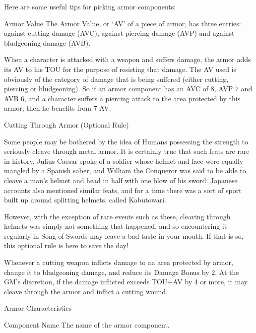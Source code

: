 \documentclass[oneside,11pt,english]{book}
\begin{document}
Here are some useful tips for picking armor components: 

 

Armor Value 
The Armor Value, or ‘AV’ of a piece of armor, has three entries: against cutting damage (AVC), against 
piercing damage (AVP) and against bludgeoning damage (AVB). 

 

When a character is attacked with a weapon and suffers damage, the armor adds its AV to his TOU for 
the purpose of resisting that damage. The AV used is obviously of the category of damage that is being 
suffered (either cutting, piercing or bludgeoning). So if an armor component has an AVC of 8, AVP 7 and 
AVB 6, and a character suffers a piercing attack to the area protected by this armor, then he benefits from 
7 AV. 

 

Cutting Through Armor (Optional Rule) 

 

Some people may be bothered by the idea of Humans possessing the strength to seriously cleave through 
metal armor. It is certainly true that such feats are rare in history. Julius Caesar spoke of a soldier whose 
helmet and face were equally mangled by a Spanish saber, and William the Conqueror was said to be able 
to cleave a man’s helmet and head in half with one blow of his sword. Japanese accounts also mentioned 
similar feats, and for a time there was a sort of sport built up around splitting helmets, called Kabutowari. 

 

However, with the exception of rare events such as these, cleaving through helmets was simply not 
something that happened, and so encountering it regularly in Song of Swords may leave a bad taste in 
your mouth. If that is so, this optional rule is here to save the day! 

 

Whenever a cutting weapon inflicts damage to an area protected by armor, change it to bludgeoning 
damage, and reduce its Damage Bonus by 2. At the GM’s discretion, if the damage inflicted exceeds 
TOU+AV by 4 or more, it may cleave through the armor and inflict a cutting wound. 

 

Armor Characteristics 

 

Component Name 
The name of the armor component. 

 
\end{document}
